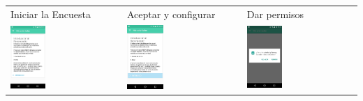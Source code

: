 {\begin{table}[h]
\begin{tabular}{lll}
\textsf{\relax 
Iniciar la Encuesta
} & \textsf{\relax 
Aceptar y configurar
} & \textsf{\relax 
Dar permisos
}\\
    {\includegraphics[width=0.33\textwidth]{anexos/graphics/app_start.jpg}}
 & 
    {\includegraphics[width=0.33\textwidth]{anexos/graphics/app_start2.jpg}}
 & 
    {\includegraphics[width=0.33\textwidth]{anexos/graphics/app_perm.jpg}}
\\
\end{tabular}
\end{table}

}
